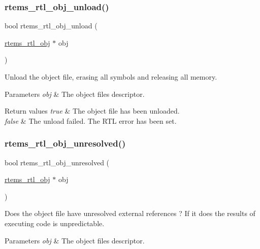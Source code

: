 \subsubsection{\texorpdfstring{rtems\_rtl\_obj\_unload()}{rtems\_rtl\_obj\_unload()}}
{\footnotesize\ttfamily bool rtems\+\_\+rtl\+\_\+obj\+\_\+unload (\begin{DoxyParamCaption}\item[{\mbox{\hyperlink{structrtems__rtl__obj}{rtems\+\_\+rtl\+\_\+obj}} $\ast$}]{obj }\end{DoxyParamCaption})}

Unload the object file, erasing all symbols and releasing all memory.


\begin{DoxyParams}{Parameters}
{\em obj} & The object file\textquotesingle{}s descriptor. \\
\hline
\end{DoxyParams}

\begin{DoxyRetVals}{Return values}
{\em true} & The object file has been unloaded. \\
\hline
{\em false} & The unload failed. The R\+TL error has been set. \\
\hline
\end{DoxyRetVals}
\mbox{\label{rtl-obj_8c_a63170089dcc2fbe5453fe01659c99616}} 
\subsubsection{\texorpdfstring{rtems\_rtl\_obj\_unresolved()}{rtems\_rtl\_obj\_unresolved()}}
{\footnotesize\ttfamily bool rtems\+\_\+rtl\+\_\+obj\+\_\+unresolved (\begin{DoxyParamCaption}\item[{\mbox{\hyperlink{structrtems__rtl__obj}{rtems\+\_\+rtl\+\_\+obj}} $\ast$}]{obj }\end{DoxyParamCaption})}

Does the object file have unresolved external references ? If it does the results of executing code is unpredictable.


\begin{DoxyParams}{Parameters}
{\em obj} & The object file\textquotesingle{}s descriptor. \\
\hline
\end{DoxyParams}

